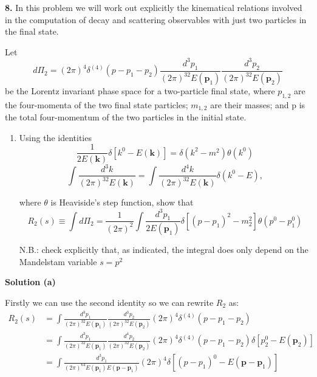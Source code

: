 \documentclass[12pt]{article}
\begin{document}
\pagestyle{fancy}

\textbf{8. } In this problem we will work out explicitly the kinematical relations involved in the computation of decay and scattering observables with just two particles in the final state.

Let
\begin{equation*}
    d\Pi_2 = (2\pi)^4\delta^{(4)}(p-p_1-p_2)\frac{d^3p_1}{(2\pi)^32E(\mathbf{p}_1)}\frac{d^3p_2}{(2\pi)^32E(\mathbf{p}_2)}
\end{equation*}
be the Lorentz invariant phase space for a two-particle final state, where $p_{1,2}$ are the four-momenta of the two final state particles; $m_{1,2}$ are their masses; and p is the total four-momentum of the two particles in the initial state.

\begin{enumerate}[label=(\alph*), start = 1]
    \item Using the identities
        \begin{equation}
            \frac{1}{2E(\mathbf{k})}\delta[k^0-E(\mathbf{k})] = \delta(k^2-m^2)\theta(k^0)
        \end{equation}
        \begin{equation}
            \int \frac{d^3k}{(2\pi)^32E(\mathbf{k})} = \int \frac{d^4k}{(2\pi)^32E(\mathbf{k})}\delta(k^0-E),
        \end{equation}
        
        where $\theta$ is Heaviside's step function, show that
        \[
            R_2(s) \equiv \int d\Pi_2 = \frac{1}{(2\pi)^2}\int\frac{d^3p_1}{2E(\mathbf{p}_1)}\delta[(p-p_1)^2-m_2^2]\theta(p^0-p_1^0)
        \]

        N.B.: check explicitly that, as indicated, the integral does only depend on the Mandelstam variable $s=p^2$
\end{enumerate}

\color{blue}

\textbf{Solution (a)}

Firstly we can use the second identity so we can rewrite $R_2$ as:
\[
    \begin{aligned}
        R_2(s) &= \int \frac{d^3p_1}{(2\pi)^32E(\mathbf{p}_1)}\frac{d^3p_2}{(2\pi)^32E(\mathbf{p}_2)} (2\pi)^4\delta^{(4)}(p-p_1-p_2) \\
               &= \int \frac{d^3p_1}{(2\pi)^32E(\mathbf{p}_1)}\frac{d^4p_2}{(2\pi)^32E(\mathbf{p}_2)} (2\pi)^4\delta^{(4)}(p-p_1-p_2) \delta[p_2^0 - E(\mathbf{p}_2)] \\
               &= \int \frac{d^3p_1}{(2\pi)^64E(\mathbf{p}_1)E(\mathbf{p}-\mathbf{p}_1)} (2\pi)^4 \delta[(p-p_1)^0 - E(\mathbf{p}-\mathbf{p}_1)]
    \end{aligned}
\]
\end{document}
